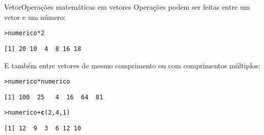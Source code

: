 \documentclass[10pt,handout]{beamer}\usepackage{graphicx, color}
\makeatletter
\newcommand{\hlfunctioncall}[1]{\textcolor[rgb]{0,0,0.545098039215686}{\textbf{#1}}}%
\newenvironment{kframe}{%
 \def\at@end@of@kframe{}%
 \ifinner\ifhmode%
  \def\at@end@of@kframe{\end{minipage}}%
  \begin{minipage}{\columnwidth}%
 \fi\fi%
 \def\FrameCommand##1{\hskip\@totalleftmargin \hskip-\fboxsep
 \colorbox{shadecolor}{##1}\hskip-\fboxsep
     \hskip-\linewidth \hskip-\@totalleftmargin \hskip\columnwidth}%
 \MakeFramed {\advance\hsize-\width
   \@totalleftmargin\z@ \linewidth\hsize
   \@setminipage}}%
 {\par\unskip\endMakeFramed%
 \at@end@of@kframe}
\newenvironment{knitrout}{}{} %
\makeatother
\begin{document}
\begin{frame}[fragile=singleslide]{Vetor}{Operações matemáticas em vetores}
Operações podem ser feitas entre um vetor e um número:
\begin{knitrout}\small
{}\color{fgcolor}\begin{kframe}
\begin{alltt}
> numerico * 2
\end{alltt}
\begin{verbatim}
[1] 20 10  4  8 16 18
\end{verbatim}
\end{kframe}
\end{knitrout}

E também entre vetores de mesmo comprimento ou com comprimentos
múltiplos:
\begin{knitrout}\small
{}\color{fgcolor}\begin{kframe}
\begin{alltt}
> numerico * numerico
\end{alltt}
\begin{verbatim}
[1] 100  25   4  16  64  81
\end{verbatim}
\begin{alltt}
> numerico + \hlfunctioncall{c}(2, 4, 1)
\end{alltt}
\begin{verbatim}
[1] 12  9  3  6 12 10
\end{verbatim}
\end{kframe}
\end{knitrout}

\end{frame}
\end{document}
